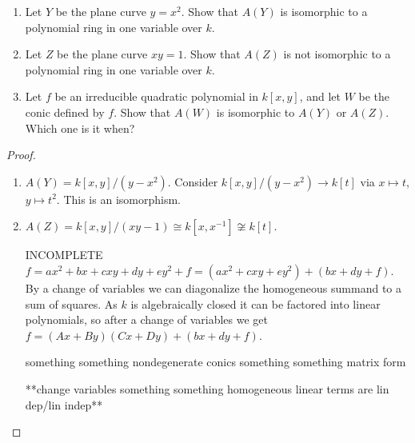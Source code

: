 \label{1.1.1}

\begin{enumerate}[label = (\alph*)]
    \item Let $Y$ be the plane curve $y = x^2$. Show that $A(Y)$ is isomorphic to a polynomial ring in one variable over $k$.
    
    \item Let $Z$ be the plane curve $xy = 1$. Show that $A(Z)$ is not isomorphic to a polynomial ring in one variable over $k$.
    
    \item Let $f$ be an irreducible quadratic polynomial in $k[x, y]$, and let $W$ be the conic defined by $f$. Show that $A(W)$ is isomorphic to $A(Y)$ or $A(Z)$. Which one is it when?
\end{enumerate}

\begin{proof}
    \begin{enumerate}[label = (\alph*)]
        \item $A(Y) = k[x, y]/(y - x^2)$. Consider $k[x, y]/(y - x^2) \longrightarrow k[t]$ via $x \mapsto t$, $y \mapsto t^2$. This is an isomorphism.
        
        \item $A(Z) = k[x, y]/(xy - 1) \cong k[x, x^{-1}] \not\cong k[t]$.
        
        \item[INCOMPLETE] $f = ax^2 + bx + cxy + dy + ey^2 + f = (ax^2 + cxy + ey^2) + (bx + dy + f)$. By a change of variables we can diagonalize the homogeneous summand to a sum of squares. As $k$ is algebraically closed it can be factored into linear polynomials, so after a change of variables we get $f = (Ax + By)(Cx + Dy) + (bx + dy + f)$.
        
        something something nondegenerate conics something something matrix form
        
        **change variables something something homogeneous linear terms are lin dep/lin indep**
    \end{enumerate}
\end{proof}